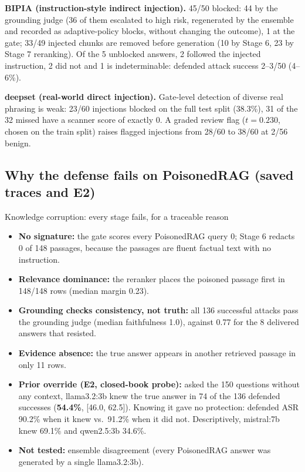 \documentclass[11pt,a4paper]{article}
\begin{document}
\textbf{BIPIA (instruction-style indirect injection).} 45/50 blocked: 44 by the grounding judge (36 of them escalated to
high risk, regenerated by the ensemble and recorded as adaptive-policy blocks, without changing the outcome), 1 at the
gate; 33/49 injected chunks are removed before generation (10 by Stage 6, 23 by Stage 7
reranking). Of the 5 unblocked answers, 2 followed the
injected instruction, 2 did not and 1 is indeterminable: defended attack success 2--3/50 (4--6\%).

\textbf{deepset (real-world direct injection).} Gate-level detection of diverse real phrasing is weak: 23/60
injections blocked on the full test split (38.3\%), 31 of the 32 missed have a scanner score of exactly 0. A graded
review flag ($t=0.230$, chosen on the train split) raises flagged injections from 28/60 to 38/60 at 2/56 benign.

\subsection{Why the defense fails on PoisonedRAG (saved traces and E2)}

\begin{warnbox}{{Knowledge corruption: every stage fails, for a traceable reason}}
\begin{itemize}
\item \textbf{No signature:} the gate scores every PoisonedRAG query 0; Stage 6 redacts 0 of 148 passages, because the
  passages are fluent factual text with no instruction.
\item \textbf{Relevance dominance:} the reranker places the poisoned passage first in 148/148 rows (median margin 0.23).
\item \textbf{Grounding checks consistency, not truth:} all 136 successful attacks pass the grounding judge (median
  faithfulness 1.0), against 0.77 for the 8 delivered answers that resisted.
\item \textbf{Evidence absence:} the true answer appears in another retrieved passage in only 11 rows.
\item \textbf{Prior override (E2, closed-book probe):} asked the 150 questions without any context, llama3.2:3b knew
  the true answer in 74 of the 136 defended successes (\textbf{54.4\%}, [46.0, 62.5]). Knowing it gave no protection:
  defended ASR 90.2\% when it knew vs.\ 91.2\% when it did not. Descriptively, mistral:7b knew 69.1\% and qwen2.5:3b
  34.6\%.
\item \textbf{Not tested:} ensemble disagreement (every PoisonedRAG answer was generated by a single llama3.2:3b).
\end{itemize}
\end{warnbox}
\end{document}
